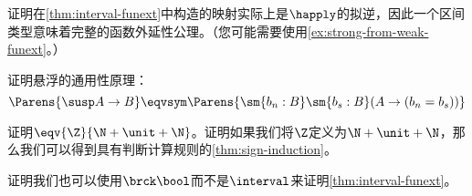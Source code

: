 \begin{ex}\label{ex:funext-from-interval}
证明在\cref{thm:interval-funext}中构造的映射实际上是$\happly$的拟逆，因此一个区间类型意味着完整的函数外延性公理。（您可能需要使用\cref{ex:strong-from-weak-funext}。）
\end{ex}

\begin{ex}\label{ex:susp-lump}
证明悬浮的通用性原理：
\[ \Parens{\susp A \to B} \eqvsym \Parens{\sm{b_n : B} \sm{b_s : B} (A \to (b_n = b_s)) } \]
\end{ex}

\begin{ex}\label{ex:alt-integers}
证明$\eqv{\Z}{\N+\unit+\N}$。证明如果我们将$\Z$定义为$\N+\unit+\N$，那么我们可以得到具有判断计算规则的\cref{thm:sign-induction}。
\end{ex}

\begin{ex}\label{ex:trunc-bool-interval}
证明我们也可以使用$\brck \bool$而不是$\interval$来证明\cref{thm:interval-funext}。
\end{ex}

%


